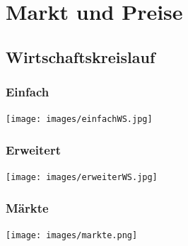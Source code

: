 \section{Markt und Preise}

\subsection{Wirtschaftskreislauf}
\begin{multicols}{2}
	\subsubsection{Einfach}
	\texttt{[image: images/einfachWS.jpg]}
	\subsubsection{Erweitert}
	\texttt{[image: images/erweiterWS.jpg]}
\end{multicols}
\subsubsection{Märkte}
\texttt{[image: images/markte.png]}

